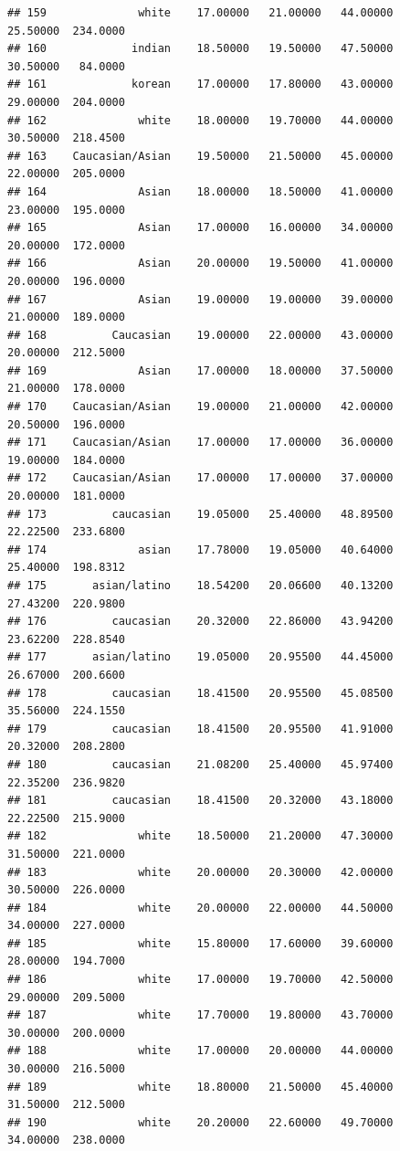 \documentclass[]{article}
\begin{document}
\begin{verbatim}
## 159              white    17.00000   21.00000   44.00000     25.50000  234.0000
## 160             indian    18.50000   19.50000   47.50000     30.50000   84.0000
## 161             korean    17.00000   17.80000   43.00000     29.00000  204.0000
## 162              white    18.00000   19.70000   44.00000     30.50000  218.4500
## 163    Caucasian/Asian    19.50000   21.50000   45.00000     22.00000  205.0000
## 164              Asian    18.00000   18.50000   41.00000     23.00000  195.0000
## 165              Asian    17.00000   16.00000   34.00000     20.00000  172.0000
## 166              Asian    20.00000   19.50000   41.00000     20.00000  196.0000
## 167              Asian    19.00000   19.00000   39.00000     21.00000  189.0000
## 168          Caucasian    19.00000   22.00000   43.00000     20.00000  212.5000
## 169              Asian    17.00000   18.00000   37.50000     21.00000  178.0000
## 170    Caucasian/Asian    19.00000   21.00000   42.00000     20.50000  196.0000
## 171    Caucasian/Asian    17.00000   17.00000   36.00000     19.00000  184.0000
## 172    Caucasian/Asian    17.00000   17.00000   37.00000     20.00000  181.0000
## 173          caucasian    19.05000   25.40000   48.89500     22.22500  233.6800
## 174              asian    17.78000   19.05000   40.64000     25.40000  198.8312
## 175       asian/latino    18.54200   20.06600   40.13200     27.43200  220.9800
## 176          caucasian    20.32000   22.86000   43.94200     23.62200  228.8540
## 177       asian/latino    19.05000   20.95500   44.45000     26.67000  200.6600
## 178          caucasian    18.41500   20.95500   45.08500     35.56000  224.1550
## 179          caucasian    18.41500   20.95500   41.91000     20.32000  208.2800
## 180          caucasian    21.08200   25.40000   45.97400     22.35200  236.9820
## 181          caucasian    18.41500   20.32000   43.18000     22.22500  215.9000
## 182              white    18.50000   21.20000   47.30000     31.50000  221.0000
## 183              white    20.00000   20.30000   42.00000     30.50000  226.0000
## 184              white    20.00000   22.00000   44.50000     34.00000  227.0000
## 185              white    15.80000   17.60000   39.60000     28.00000  194.7000
## 186              white    17.00000   19.70000   42.50000     29.00000  209.5000
## 187              white    17.70000   19.80000   43.70000     30.00000  200.0000
## 188              white    17.00000   20.00000   44.00000     30.00000  216.5000
## 189              white    18.80000   21.50000   45.40000     31.50000  212.5000
## 190              white    20.20000   22.60000   49.70000     34.00000  238.0000

\end{verbatim}
\end{document}

